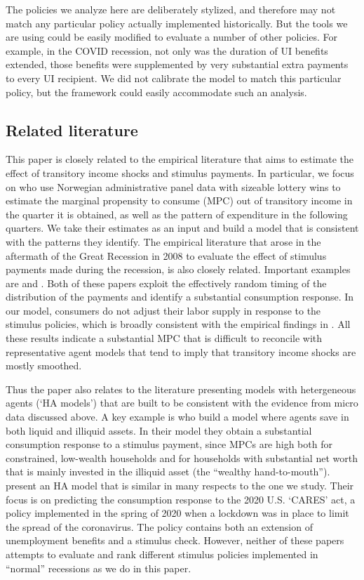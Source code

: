 \documentclass[../HAFiscal]{subfiles}
\begin{document}
The policies we analyze here are deliberately stylized, and therefore may not match any particular policy actually implemented historically.  But the tools we are using could be easily modified to evaluate a number of other policies.  For example, in the COVID recession, not only was the duration of UI benefits extended, those benefits were supplemented by very substantial extra payments to every UI recipient.  We did not calibrate the model to match this particular policy, but the framework could easily accommodate such an analysis.

\subsection{Related literature}
\label{sec:lit}

This paper is closely related to the empirical literature that aims to estimate the effect of transitory income shocks and stimulus payments. In particular, we focus on \cite{fagereng_mpc_2021} who use Norwegian administrative panel data with sizeable lottery wins to estimate the marginal propensity to consume (MPC) out of transitory income in the quarter it is obtained, as well as the pattern of expenditure in the following quarters. We take their estimates as an input and build a model that is consistent with the patterns they identify. The empirical literature that arose in the aftermath of the Great Recession in 2008 to evaluate the effect of stimulus payments made during the recession, is also closely related. Important examples are \cite{parker2013consumer} and \cite{broda2014economic}. Both of these papers exploit the effectively random timing of the distribution of the payments and identify a substantial consumption response. In our model, consumers do not adjust their labor supply in response to the stimulus policies, which is broadly consistent with the empirical findings in \cite{ganong2022spending}. All these results indicate a substantial MPC that is difficult to reconcile with representative agent models that tend to imply that transitory income shocks are mostly smoothed. 

Thus the paper also relates to the literature presenting models with hetergeneous agents (`HA models') that are built to be consistent with the evidence from micro data discussed above. A key example is \cite{kaplan2014model} who build a model where agents save in both liquid and illiquid assets. In their model they obtain a substantial consumption response to a stimulus payment, since MPCs are high both for constrained, low-wealth households and for households with substantial net worth that is mainly invested in the illiquid asset (the ``wealthy hand-to-mouth''). \cite{carroll2020modeling} present an HA model that is similar in many respects to the one we study. Their focus is on predicting the consumption response to the 2020 U.S. `CARES' act, a policy implemented in the spring of 2020 when a lockdown was in place to limit the spread of the coronavirus. The policy contains both an extension of unemployment benefits and a stimulus check. However, neither of these papers attempts to evaluate and rank different stimulus policies implemented in ``normal'' recessions as we do in this paper. 
\end{document}
